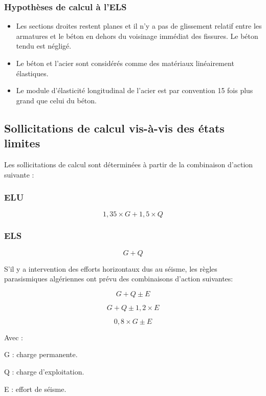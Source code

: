 \documentclass[12pt,a4paper]{report}
\numberwithin{equation}{section}
\begin{document}
	
	\subsubsection{Hypothèses de calcul à l'ELS}
	
	\begin{itemize}
		\item Les sections droites restent planes et il n'y a pas de glissement relatif entre les
		armatures et le béton en dehors du voisinage immédiat des fissures. Le béton tendu est
		négligé.
		\item Le béton et l'acier sont considérés comme des matériaux linéairement élastiques.
		\item Le module d'élasticité longitudinal de l'acier est par convention 15 fois plus grand que
		celui du béton.
	\end{itemize}
	
	\subsection{Sollicitations de calcul vis-à-vis des états limites}
	
	Les sollicitations de calcul sont déterminées à partir de la combinaison d’action suivante :
	
	\subsubsection{ELU}
	
	\[ 1,35 \times G + 1,5 \times Q \]
	
	\subsubsection{ELS}
	
	\[ G + Q \]
	
	S’il y a intervention des efforts horizontaux dus au séisme, les règles parasismiques
	algériennes ont prévu des combinaisons d’action suivantes\footnotemark[1] :
	
	\[ G + Q \pm E \]
	
	\[ G + Q \pm 1,2 \times E \]
	
	\[ 0,8 \times G \pm E \]
	
	Avec :
	
	G : charge permanente.
	
	Q : charge d’exploitation.
	
	E : effort de séisme.
	
	
\end{document}
